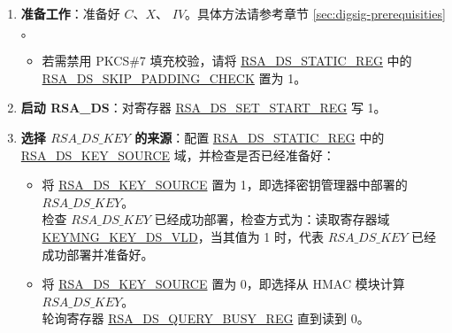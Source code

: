 \documentclass[main\_\_CN.tex]{subfiles}
\begin{document}
\begin{enumerate}

    \item {\bfseries 准备工作}：准备好 \begin{math}C\end{math}、\begin{math}X\end{math}、 \begin{math}IV\end{math}。具体方法请参考章节 \ref{sec:digsig-prerequisities} 。
    \begin{itemize}
        \item 若需禁用 PKCS\#7 填充校验，请将 \hyperref[regdesc:RSADSSTATICREG]{RSA\_DS\_STATIC\_REG} 中的 \hyperref[fielddesc:RSADSSKIPPADDINGCHECK]{RSA\_DS\_SKIP\_PADDING\_CHECK} 置为 1。
    \end{itemize}

    \item {\bfseries 启动 RSA\_DS}：对寄存器 \hyperref[regdesc:RSADSSETSTARTREG]{RSA\_DS\_SET\_START\_REG} 写 1。

    \item {\bfseries 选择 \begin{math}RSA\_DS\_KEY\end{math} 的来源}：配置 \hyperref[regdesc:RSADSSTATICREG]{RSA\_DS\_STATIC\_REG} 中的 \hyperref[fielddesc:RSADSKEYSOURCE]{RSA\_DS\_KEY\_SOURCE} 域，并检查是否已经准备好：
    \begin{itemize}
        \item 将 \hyperref[fielddesc:RSADSKEYSOURCE]{RSA\_DS\_KEY\_SOURCE} 置为 1，即选择密钥管理器中部署的 \begin{math}RSA\_DS\_KEY\end{math}。\\
        检查 \begin{math}RSA\_DS\_KEY\end{math} 已经成功部署，检查方式为：读取寄存器域 \hyperref[fielddesc:KEYMNGKEYDSVLD]{KEYMNG\_KEY\_DS\_VLD}，当其值为 1 时，代表 \begin{math}RSA\_DS\_KEY\end{math} 已经成功部署并准备好。
        \item 将 \hyperref[fielddesc:RSADSKEYSOURCE]{RSA\_DS\_KEY\_SOURCE} 置为 0，即选择从 HMAC 模块计算 \begin{math}RSA\_DS\_KEY\end{math}。\\
        轮询寄存器 \hyperref[regdesc:RSADSQUERYBUSYREG]{RSA\_DS\_QUERY\_BUSY\_REG} 直到读到 0。


\end{itemize}
\end{enumerate}
\end{document}
